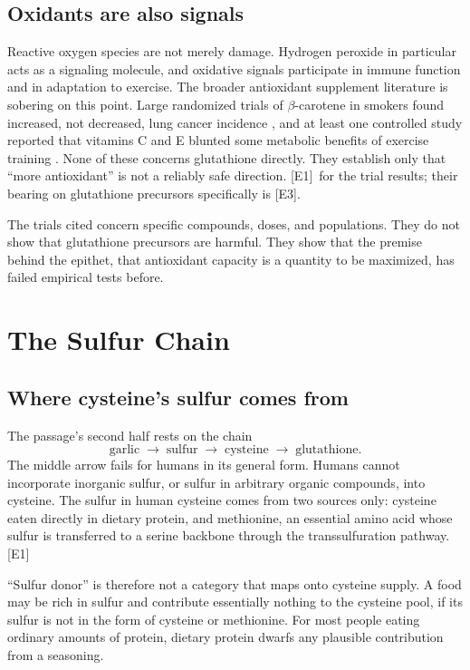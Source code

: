 \documentclass[11pt,a4paper]{article}
\theoremstyle{plain}
\theoremstyle{definition}
\theoremstyle{remark}
\newcommand{\tier}[1]{\textup{\textsc{[#1]}}}
\newcommand{\Eone}{\tier{E1}}
\newcommand{\Ethree}{\tier{E3}}
\begin{document}
\subsection{Oxidants are also signals}

Reactive oxygen species are not merely damage. Hydrogen peroxide in particular acts as a signaling molecule, and oxidative signals participate in immune function and in adaptation to exercise. The broader antioxidant supplement literature is sobering on this point. Large randomized trials of $\beta$-carotene in smokers found increased, not decreased, lung cancer incidence \cite{atbc1994,caret1996}, and at least one controlled study reported that vitamins C and E blunted some metabolic benefits of exercise training \cite{ristow2009}. None of these concerns glutathione directly. They establish only that ``more antioxidant'' is not a reliably safe direction. \Eone\ for the trial results; their bearing on glutathione precursors specifically is \Ethree.

\begin{caution}
The trials cited concern specific compounds, doses, and populations. They do not show that glutathione precursors are harmful. They show that the premise behind the epithet, that antioxidant capacity is a quantity to be maximized, has failed empirical tests before.
\end{caution}
\section{The Sulfur Chain}

\subsection{Where cysteine's sulfur comes from}

The passage's second half rests on the chain
\[
\text{garlic} \;\to\; \text{sulfur} \;\to\; \text{cysteine} \;\to\; \text{glutathione}.
\]
The middle arrow fails for humans in its general form. Humans cannot incorporate inorganic sulfur, or sulfur in arbitrary organic compounds, into cysteine. The sulfur in human cysteine comes from two sources only: cysteine eaten directly in dietary protein, and methionine, an essential amino acid whose sulfur is transferred to a serine backbone through the transsulfuration pathway. \Eone

``Sulfur donor'' is therefore not a category that maps onto cysteine supply. A food may be rich in sulfur and contribute essentially nothing to the cysteine pool, if its sulfur is not in the form of cysteine or methionine. For most people eating ordinary amounts of protein, dietary protein dwarfs any plausible contribution from a seasoning.
\end{document}
